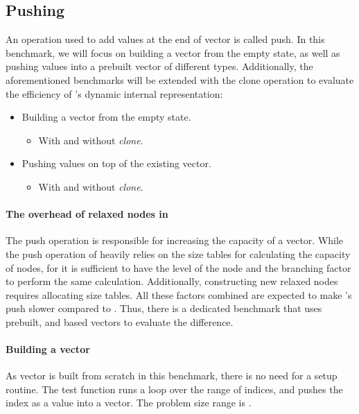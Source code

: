 \subsection{Pushing}
An operation used to add values at the end of vector is called push. In this benchmark, we will focus on building a vector from the empty state, as well as pushing values into a prebuilt vector of different types. Additionally, the aforementioned benchmarks will be extended with the clone operation to evaluate the efficiency of \pvec{}'s dynamic internal representation:
\begin{itemize}
    \item Building a vector from the empty state.
    \begin{itemize}
        \item With and without \emph{clone}.
    \end{itemize}
    \item Pushing values on top of the existing vector.
    \begin{itemize}
        \item With and without \emph{clone}.
    \end{itemize}
\end{itemize}

\paragraph*{The overhead of relaxed nodes in \rrbtree{}}
The push operation is responsible for increasing the capacity of a vector. While the push operation of \rrbtree{} heavily relies on the size tables for calculating the capacity of nodes, for \rbtree{} it is sufficient to have the level of the node and the branching factor to perform the same calculation. Additionally, constructing new relaxed nodes requires allocating size tables. All these factors combined are expected to make \rrbtree{}'s push slower compared to \rbtree{}. Thus, there is a dedicated benchmark that uses prebuilt, \rrbtree{} and \rbtree{} based vectors to evaluate the difference.

\paragraph*{Building a vector}
As vector is built from scratch in this benchmark, there is no need for a setup routine. The test function runs a loop over the \range{[0, N)} range of indices, and pushes the index as a value into a vector. The problem size range is \range{[10, 1m]}.

